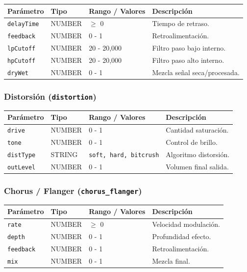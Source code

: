 \begin{table}[H]
\centering
\small
\begin{tabular}{@{}llp{3cm}p{4cm}@{}}
\toprule
Parámetro & Tipo & Rango / Valores & Descripción \\ \midrule
\texttt{delayTime} & NUMBER & $\ge$ 0 & Tiempo de retraso. \\
\texttt{feedback} & NUMBER & 0 - 1 & Retroalimentación. \\
\texttt{lpCutoff} & NUMBER & 20 - 20,000 & Filtro paso bajo interno. \\
\texttt{hpCutoff} & NUMBER & 20 - 20,000 & Filtro paso alto interno. \\
\texttt{dryWet} & NUMBER & 0 - 1 & Mezcla señal seca/procesada. \\ \bottomrule
\end{tabular}
\end{table}

\subsubsection{Distorsión (\texttt{distortion})}

\begin{table}[H]
\centering
\small
\begin{tabular}{@{}llp{3cm}p{4cm}@{}}
\toprule
Parámetro & Tipo & Rango / Valores & Descripción \\ \midrule
\texttt{drive} & NUMBER & 0 - 1 & Cantidad saturación. \\
\texttt{tone} & NUMBER & 0 - 1 & Control de brillo. \\
\texttt{distType} & STRING & \texttt{soft, hard, bitcrush} & Algoritmo distorsión. \\
\texttt{outLevel} & NUMBER & 0 - 1 & Volumen final salida. \\ \bottomrule
\end{tabular}
\end{table}

\subsubsection{Chorus / Flanger (\texttt{chorus\_flanger})}

\begin{table}[H]
\centering
\small
\begin{tabular}{@{}llp{3cm}p{4cm}@{}}
\toprule
Parámetro & Tipo & Rango / Valores & Descripción \\ \midrule
\texttt{rate} & NUMBER & $\ge$ 0 & Velocidad modulación. \\
\texttt{depth} & NUMBER & 0 - 1 & Profundidad efecto. \\
\texttt{feedback} & NUMBER & 0 - 1 & Retroalimentación. \\
\texttt{mix} & NUMBER & 0 - 1 & Mezcla final. \\ \bottomrule
\end{tabular}
\end{table}

